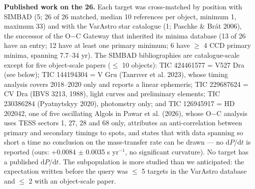 \documentclass{aa}
\begin{document}
\textbf{Published work on the 26.} Each target was cross-matched by position with SIMBAD (5\arcsec; 26 of 26 matched, median 10 references per object, minimum 1, maximum 33) and with the VarAstro star catalogue (1\arcmin; Paschke \& Brát 2006), the successor of the O$-$C Gateway that inherited its minima database (13 of 26 have an entry; 12 have at least one primary minimum; 6 have $\ge$ 4 CCD primary minima, spanning 7.7--34 yr). The SIMBAD bibliographies are catalogue-scale except for five object-scale papers ($\le$ 10 objects): TIC 424461577 = V527 Dra (see below); TIC 144194304 = V Gru (Tanrıver et al. 2023), whose timing analysis covers 2018--2020 only and reports a linear ephemeris; TIC 229687624 = CV Dra (IBVS 3213, 1988), light curves and preliminary elements; TIC 230386284 (Pyatnytskyy 2020), photometry only; and TIC 126945917 = HD 202042, one of five oscillating Algols in Pawar et al. (2026), whose O$-$C analysis uses TESS sectors 1, 27, 28 and 68 only, attributes an anti-correlation between primary and secondary timings to spots, and states that with data spanning so short a time no conclusion on the mass-transfer rate can be drawn --- no $\mathrm{d}P/\mathrm{d}t$ is reported (ours: +0.0084 $\pm$ 0.0035 s yr$^{-1}$, no significant curvature). No target has a published $\mathrm{d}P/\mathrm{d}t$. The subpopulation is more studied than we anticipated: the expectation written before the query was $\le$ 5 targets in the VarAstro database and $\le$ 2 with an object-scale paper.
\end{document}
